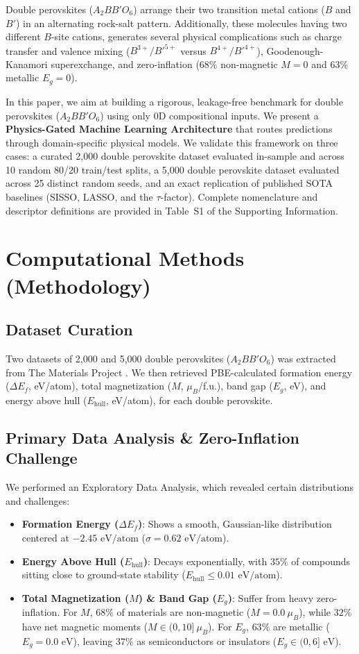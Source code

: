 \documentclass[journal=jcisd8,manuscript=article]{achemso}
\begin{document}
Double perovskites ($A_2BB'O_6$) arrange their two transition metal cations ($B$ and $B'$) in an alternating rock-salt pattern. Additionally, these molecules having two different $B$-site cations, generates several physical complications such as charge transfer and valence mixing ($B^{3+}/B'^{5+}$ versus $B^{4+}/B'^{4+}$), Goodenough-Kanamori superexchange, and zero-inflation ($68\%$ non-magnetic $M=0$ and $63\%$ metallic $E_g=0$).

In this paper, we aim at building a rigorous, leakage-free benchmark for double perovskites ($A_2BB'O_6$) using only 0D compositional inputs. We present a \textbf{Physics-Gated Machine Learning Architecture} that routes predictions through domain-specific physical models. We validate this framework on three cases: a curated 2,000 double perovskite dataset evaluated in-sample and across 10 random 80/20 train/test splits, a 5,000 double perovskite dataset evaluated across 25 distinct random seeds, and an exact replication of published SOTA baselines (SISSO, LASSO, and the $\tau$-factor). Complete nomenclature and descriptor definitions are provided in Table~S1 of the Supporting Information.

\section{Computational Methods (Methodology)}

\subsection{Dataset Curation}
Two datasets of 2,000 and 5,000 double perovskites ($A_2BB'O_6$) was extracted from The Materials Project \cite{materialsproject}. We then retrieved PBE-calculated formation energy ($\Delta E_f$, eV/atom), total magnetization ($M$, $\mu_B$/f.u.), band gap ($E_g$, eV), and energy above hull ($E_{\text{hull}}$, eV/atom), for each double perovskite.

\subsection{Primary Data Analysis \& Zero-Inflation Challenge}
We performed an Exploratory Data Analysis, which revealed certain distributions and challenges:
\begin{itemize}
\item \textbf{Formation Energy ($\Delta E_f$)}: Shows a smooth, Gaussian-like distribution centered at $-2.45\text{ eV/atom}$ ($\sigma = 0.62\text{ eV/atom}$).
\item \textbf{Energy Above Hull ($E_{\text{hull}}$)}: Decays exponentially, with $35\%$ of compounds sitting close to ground-state stability ($E_{\text{hull}} \le 0.01\text{ eV/atom}$).
\item \textbf{Total Magnetization ($M$) \& Band Gap ($E_g$)}: Suffer from heavy zero-inflation. For $M$, $68\%$ of materials are non-magnetic ($M = 0.0\ \mu_B$), while $32\%$ have net magnetic moments ($M \in (0, 10]\ \mu_B$). For $E_g$, $63\%$ are metallic ($E_g = 0.0\text{ eV}$), leaving $37\%$ as semiconductors or insulators ($E_g \in (0, 6]\text{ eV}$).
\end{itemize}
\end{document}
